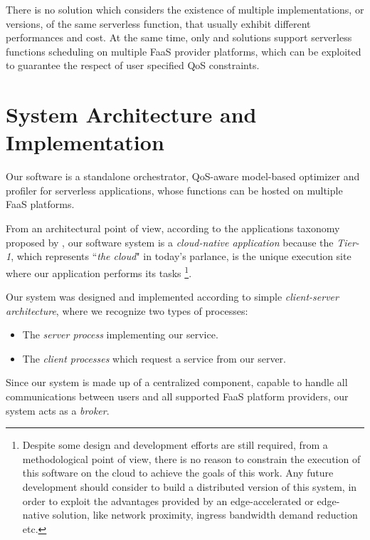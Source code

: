 \documentclass[12pt,a4paper]{report}
\newcommand{\ItalicQuotMark}[1]{``\textit{#1}"}
\begin{document}
There is no solution which considers the existence of multiple implementations, or versions, of the same serverless function, that usually exhibit different performances and cost. At the same time, only \citet{NUOVODOCUMENTO} and \citet{xAFCL} solutions support serverless functions scheduling on multiple FaaS provider platforms, which can be exploited to guarantee the respect of user specified QoS constraints.



\chapter{System Architecture and Implementation}\label{chapterArch}

Our software is a standalone orchestrator, QoS-aware model-based optimizer and profiler for serverless applications, whose functions can be hosted on multiple FaaS platforms.

From an architectural point of view, according to the applications taxonomy proposed by \citet{MSA}, our software system is a \textit{cloud-native application} because the \textit{Tier-1}, which represents \ItalicQuotMark{the cloud} in today’s parlance, is the unique execution site where our application performs its tasks \footnote{Despite some design and development efforts are still required, from a methodological point of view, there is no reason to constrain the execution of this software on the cloud to achieve the goals of this work. Any future development should consider to build a distributed version of this system, in order to exploit the advantages provided by an edge-accelerated or edge-native solution, like network proximity, ingress bandwidth demand reduction etc.}.

Our system was designed and implemented according to simple \textit{client-server architecture}, where we recognize two types of processes:

\begin{itemize}
	\item The \textit{server process} implementing our service.
	
	\item The \textit{client processes} which request a service from our server.
\end{itemize}


Since our system is made up of a centralized component, capable to handle all communications between users and all supported FaaS platform providers, our system acts as a \textit{broker}.
\end{document}

